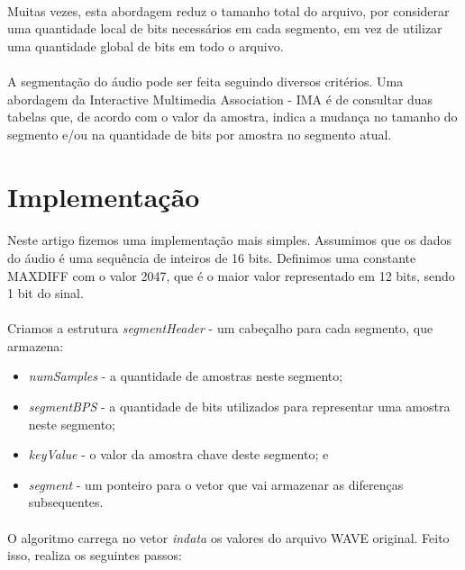 \documentclass[a4paper,12pt]{article}
\begin{document}
\paragraph{}
Muitas vezes, esta abordagem reduz o tamanho total do arquivo, por considerar uma quantidade local de bits necessários em cada segmento, em vez de utilizar uma quantidade global de bits em todo o arquivo.

\paragraph{}
A segmentação do áudio pode ser feita seguindo diversos critérios. Uma abordagem da Interactive Multimedia Association - IMA é de consultar duas tabelas que, de acordo com o valor da amostra, indica a mudança no tamanho do segmento e/ou na quantidade de bits por amostra no segmento atual\cite{Pan-1993}.

\section{Implementação}

\paragraph{}
Neste artigo fizemos uma implementação mais simples. Assumimos que os dados do áudio é uma sequência de inteiros de 16 bits. Definimos uma constante MAXDIFF com o valor 2047, que é o maior valor representado em 12 bits, sendo 1 bit do sinal.

\paragraph{}
Criamos a estrutura \textit{segmentHeader} - um cabeçalho para cada segmento, que armazena:
\begin{itemize}
\item \textit{numSamples} - a quantidade de amostras neste segmento;
\item \textit{segmentBPS} - a quantidade de bits utilizados para representar uma amostra neste segmento;
\item \textit{keyValue} - o valor da amostra chave deste segmento; e
\item \textit{segment} - um ponteiro para o vetor que vai armazenar as diferenças subsequentes.
\end{itemize}

\paragraph{}
O algoritmo carrega no vetor \textit{indata} os valores do arquivo WAVE original. Feito isso, realiza os seguintes passos:\\
\end{document}
